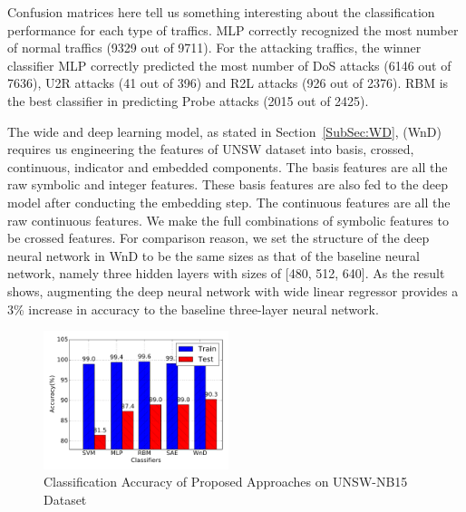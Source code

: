 Confusion matrices here tell us something interesting about the classification performance
for each type of traffics.
MLP correctly recognized the most number of normal traffics (9329 out of 9711).
For the attacking traffics, the winner classifier MLP correctly predicted the most
number of DoS attacks (6146 out of 7636), U2R attacks (41 out of 396)
and R2L attacks (926 out of 2376).
RBM is the best classifier in predicting Probe attacks (2015 out of 2425).

The wide and deep learning model, as stated in Section~\ref{SubSec:WD},
(WnD) requires us engineering the features of UNSW dataset into
basis, crossed, continuous, indicator and embedded components.
The basis features are all the raw symbolic and integer features.
These basis features are also fed to the deep model after conducting the embedding step.
The continuous features are all the raw continuous features.
We make the full combinations of symbolic features to be crossed features.
For comparison reason, we set the structure of the deep neural network in WnD to be
the same sizes as that of the baseline neural network,
namely three hidden layers with sizes of [480, 512, 640].
As the result shows, augmenting the deep neural network with wide linear regressor
provides a 3\% increase in accuracy to the baseline three-layer neural network.

\begin{figure}[h]
    \centering
    \includegraphics[width=0.48\textwidth]{figures/comp_accuracy_unsw.pdf}
    \caption{Classification Accuracy of Proposed Approaches on UNSW-NB15 Dataset}
    \label{Fig:CompAccuracyUNSW}
\end{figure}

